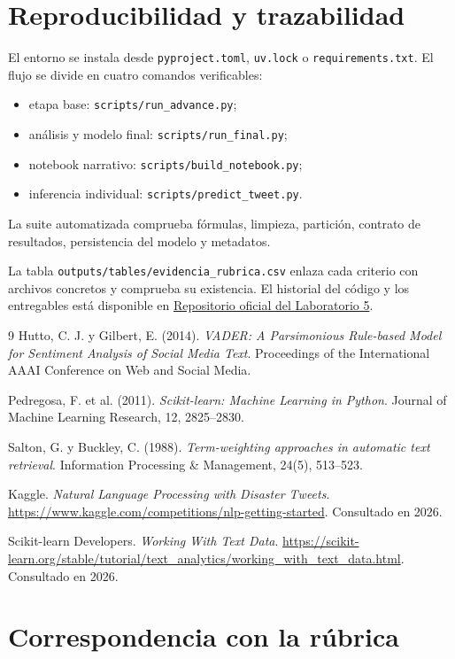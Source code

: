 \documentclass[11pt,letterpaper]{article}
\newcommand{\repo}{\href{https://github.com/DanielBarillasM/Laboratorio-5.-Mineria-de-Textos-y-Analisis-de-Sentimientos_Grupo-1_DS_Sec-10}{Repositorio oficial del Laboratorio 5}}
\begin{document}
\section{Reproducibilidad y trazabilidad}

El entorno se instala desde \texttt{pyproject.toml}, \texttt{uv.lock} o \texttt{requirements.txt}. El flujo se divide en cuatro comandos verificables:
\begin{itemize}
  \item etapa base: \texttt{scripts/run\_advance.py};
  \item análisis y modelo final: \texttt{scripts/run\_final.py};
  \item notebook narrativo: \texttt{scripts/build\_notebook.py};
  \item inferencia individual: \texttt{scripts/predict\_tweet.py}.
\end{itemize}
La suite automatizada comprueba fórmulas, limpieza, partición, contrato de resultados, persistencia del modelo y metadatos.

La tabla \texttt{outputs/tables/evidencia\_rubrica.csv} enlaza cada criterio con archivos concretos y comprueba su existencia. El historial del código y los entregables está disponible en \repo.

\begin{thebibliography}{9}
Hutto, C. J. y Gilbert, E. (2014). \emph{VADER: A Parsimonious Rule-based Model for Sentiment Analysis of Social Media Text}. Proceedings of the International AAAI Conference on Web and Social Media.

Pedregosa, F. et al. (2011). \emph{Scikit-learn: Machine Learning in Python}. Journal of Machine Learning Research, 12, 2825--2830.

Salton, G. y Buckley, C. (1988). \emph{Term-weighting approaches in automatic text retrieval}. Information Processing \& Management, 24(5), 513--523.

Kaggle. \emph{Natural Language Processing with Disaster Tweets}. \url{https://www.kaggle.com/competitions/nlp-getting-started}. Consultado en 2026.

Scikit-learn Developers. \emph{Working With Text Data}. \url{https://scikit-learn.org/stable/tutorial/text_analytics/working_with_text_data.html}. Consultado en 2026.
\end{thebibliography}

\appendix
\section{Correspondencia con la rúbrica}
\end{document}
